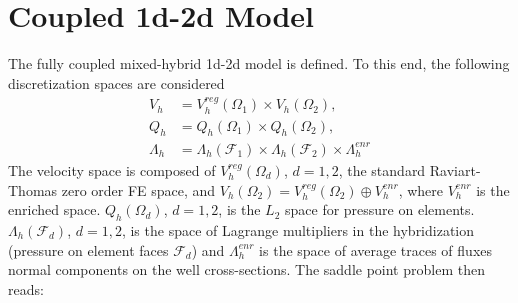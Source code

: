 \section{Coupled 1d-2d Model}
\label{sec:coupled_12d}
The fully coupled mixed-hybrid 1d-2d model is defined.
To this end, the following discretization spaces are considered
\begin{align}
    V_h &= V^{reg}_h(\Omega_1) \times V_h(\Omega_2), \label{eqn:vel_h_space}\\
    Q_h &= Q_h(\Omega_1) \times Q_h(\Omega_2), \label{eqn:press_h_space} \\
    \Lambda_h &= \Lambda_h(\mathcal{F}_1)\times \Lambda_h(\mathcal{F}_2) \times \Lambda^{enr}_h \label{eqn:lambda_h_space}
\end{align}
The velocity space is composed of $V^{reg}_h(\Omega_d)$, $d=1,2$, the standard Raviart-Thomas zero order FE space,
and $V_h(\Omega_2) = V^{reg}_{h}(\Omega_2) \oplus V^{enr}_h$, where $V^{enr}_h$ is the enriched space.
$Q_h(\Omega_d)$, $d=1,2$, is the $L_2$ space for pressure on elements.
$\Lambda_h(\mathcal{F}_d)$, $d=1,2$, is the space of Lagrange multipliers in the hybridization (pressure on element faces $\mathcal{F}_d$)
and $\Lambda^{enr}_h$ is the space of average traces of fluxes normal components on the well cross-sections.
The saddle point problem then reads:
